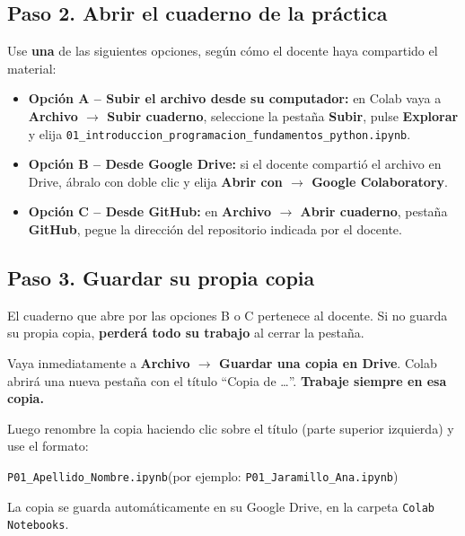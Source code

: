 \documentclass[11pt,a4paper]{article}
\newcommand{\code}[1]{\texttt{#1}}
\newcommand{\nbfile}{\texttt{01\_\allowbreak introduccion\_\allowbreak programacion\_\allowbreak fundamentos\_\allowbreak python.ipynb}}
\newcommand{\menu}[1]{\textbf{\color{moradoOsc}#1}}
\begin{document}
\subsection{Paso 2. Abrir el cuaderno de la práctica}
Use \textbf{una} de las siguientes opciones, según cómo el docente haya compartido el material:

\begin{itemize}
  \item \textbf{Opción A -- Subir el archivo desde su computador:} en Colab vaya a \menu{Archivo $\rightarrow$ Subir cuaderno}, seleccione la pestaña \menu{Subir}, pulse \menu{Explorar} y elija \nbfile{}.
  \item \textbf{Opción B -- Desde Google Drive:} si el docente compartió el archivo en Drive, ábralo con doble clic y elija \menu{Abrir con $\rightarrow$ Google Colaboratory}.
  \item \textbf{Opción C -- Desde GitHub:} en \menu{Archivo $\rightarrow$ Abrir cuaderno}, pestaña \menu{GitHub}, pegue la dirección del repositorio indicada por el docente.
\end{itemize}

\subsection{Paso 3. Guardar su propia copia}
\begin{crit}
El cuaderno que abre por las opciones B o C pertenece al docente. Si no guarda su propia copia, \textbf{perderá todo su trabajo} al cerrar la pestaña.

Vaya inmediatamente a \menu{Archivo $\rightarrow$ Guardar una copia en Drive}. Colab abrirá una nueva pestaña con el título ``Copia de \ldots''. \textbf{Trabaje siempre en esa copia.}
\end{crit}

Luego renombre la copia haciendo clic sobre el título (parte superior izquierda) y use el formato:
\begin{center}
\code{P01\_Apellido\_Nombre.ipynb}\qquad (por ejemplo: \code{P01\_Jaramillo\_Ana.ipynb})
\end{center}
La copia se guarda automáticamente en su Google Drive, en la carpeta \code{Colab Notebooks}.
\end{document}
